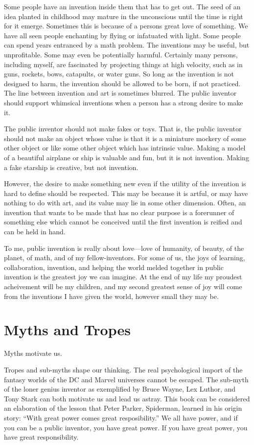 \documentclass[
	fontsize=10pt, %
	twoside=false, %
	secnumdepth=1, %
]{kaobook}
\begin{document}
Some people have an invention inside them that has to get out.
The seed of an idea planted in childhood may mature in the unconscious
until the time is right for it emerge.
Sometimes this is because of a persons great love of something.
We have all seen people enchanting by flying or
infatuated with light.
Some people can spend years entranced by a math problem.
The inventions may be useful, but unprofitable.
Some may even be potentially harmful. Certainly many persons,
including myself, are fascinated by projecting things at
high velocity, such as in guns, rockets, bows,
catapults, or water guns.
So long as the invention is not designed to harm,
the invention should be allowed to be born, if not practiced.
The line between invention and art is sometimes blurred.
The public inventor should support whimsical inventions
when a person has a strong desire to make it.

The public inventor should not make fakes or toys.
That is, the public inventor should not make an object
whose value is that it is a miniature mockery of some
other object or like some other object which has intrinsic value.
Making a model of a beautiful airplane or ship is valuable
and fun, but it is not invention.
Making a fake starship is creative, but not invention.

However, the desire to make something new even if the
utility of the invention is hard to define should be
respected. This may be because it is artful, or may
have nothing to do with art, and its value may lie
in some other dimension.
Often, an invention that wants to be made that has
no clear purpose is a forerunner of something else
which cannot be conceived until the first invention
is reified and can be held in hand.

To me, public invention is really about love---love of humanity,
of beauty, of the planet, of math, and of my fellow-inventors.
For some of us, the joys of learning, collaboration, invention,
and helping the world melded together in public invention
is the greatest joy we can imagine.
At the end of my life my proudest acheivement will be my children,
and my second greatest sense of joy will come from the
inventions I have given the world, however small they may be.


\section{Myths and Tropes}

Myths motivate us.

Tropes and sub-myths shape our thinking.
The real psychological import of the fantasy worlds of the DC and Marvel universes cannot be escaped.
The sub-myth of the loner genius inventor as exemplified by Bruce Wayne, Lex Luthor, and Tony Stark
can both motivate us and lead us astray.
This book can be considered an elaboration of the lesson that Peter Parker, Spiderman, learned
in his origin story: ``With great power comes great resposibility.''
We all have power, and if you can be a public inventor, you have great power. If you have great power, you have great responsibility.
\end{document}

